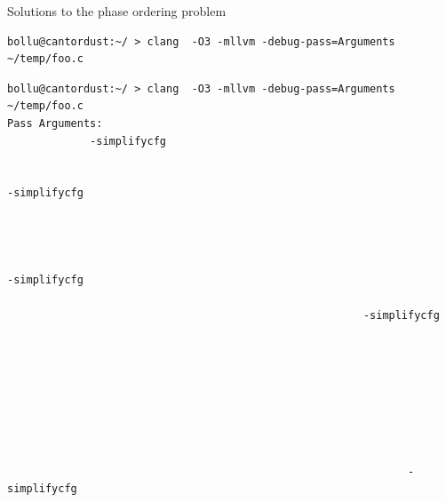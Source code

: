 \documentclass[8pt]{beamer}
\begin{document}
\begin{frame}[fragile]{Solutions to the phase ordering problem}
\begin{verbatim}
bollu@cantordust:~/ > clang  -O3 -mllvm -debug-pass=Arguments ~/temp/foo.c
\end{verbatim}
\begin{verbatim}
bollu@cantordust:~/ > clang  -O3 -mllvm -debug-pass=Arguments ~/temp/foo.c
Pass Arguments:                                               
             -simplifycfg                                                   
                                                                     
                                                                              
-simplifycfg                                                       
                                                                   
                                                                 
                                                                               
                                                                               
-simplifycfg                                                                 
                                                              
                                                        -simplifycfg         
                                                                           
                                                                        
                                                                        
                                                                              
                                                                            
                                                                       
                                                                           
                                                                              
                                                               -simplifycfg
                                                                
                                                                     
                                                                       

\end{verbatim}
\end{frame}
\end{document}
